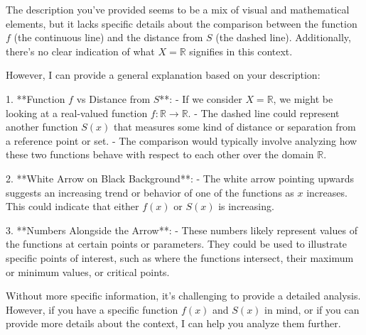 The description you've provided seems to be a mix of visual and mathematical elements, but it lacks specific details about the comparison between the function \( f \) (the continuous line) and the distance from \( S \) (the dashed line). Additionally, there's no clear indication of what \( X = \mathbb{R} \) signifies in this context.

However, I can provide a general explanation based on your description:

1. **Function \( f \) vs Distance from \( S \)**:
   - If we consider \( X = \mathbb{R} \), we might be looking at a real-valued function \( f: \mathbb{R} \to \mathbb{R} \).
   - The dashed line could represent another function \( S(x) \) that measures some kind of distance or separation from a reference point or set.
   - The comparison would typically involve analyzing how these two functions behave with respect to each other over the domain \( \mathbb{R} \).

2. **White Arrow on Black Background**:
   - The white arrow pointing upwards suggests an increasing trend or behavior of one of the functions as \( x \) increases. This could indicate that either \( f(x) \) or \( S(x) \) is increasing.

3. **Numbers Alongside the Arrow**:
   - These numbers likely represent values of the functions at certain points or parameters. They could be used to illustrate specific points of interest, such as where the functions intersect, their maximum or minimum values, or critical points.

Without more specific information, it's challenging to provide a detailed analysis. However, if you have a specific function \( f(x) \) and \( S(x) \) in mind, or if you can provide more details about the context, I can help you analyze them further.